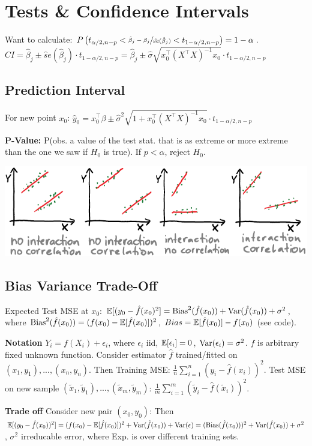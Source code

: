 \section*{Tests \& Confidence Intervals}
Want to calculate: $P\left( t_{\alpha / 2, n-p} < \sfrac{\hat \beta_j - \beta_j} {\hat {se}(\hat \beta_j)} < t_{1-\alpha / 2, n-p} \right) = 1 - \alpha$.
$CI = \hat \beta_j \pm \hat se(\hat \beta_j) \cdot t_{1- \alpha / 2, n-p} = \hat \beta_j \pm \hat \sigma \sqrt{x_0^\top (X^\top X)^{-1} x_0} \cdot t_{1- \alpha / 2, n-p}$
\subsection*{Prediction Interval}
For new point $x_0$:
$\hat y_0 = x_0^\top \beta \pm \hat \sigma^2 \sqrt{1 + x_0^\top (X^\top X)^{-1}x_0} \cdot t_{1-\alpha / 2, n-p}$

\textbf{P-Value:} P(obs. a value of the test stat. that is as extreme or more extreme than the one we saw if $H_0$ is true).
If $p < \alpha$, reject $H_0$.

\includegraphics[width=0.7\linewidth]{img/interaction.PNG}

\subsection*{Bias Variance Trade-Off}
Expected Test MSE at $x_0$: $\mathbb{E}[(y_0 - \hat f(x_0)^2] = \text{Bias}^2 (\hat f(x_0)) + \text{Var}(\hat f(x_0)) + \sigma^2$, where $\text{Bias}^2(\hat f(x_0)) = (f(x_0)-\mathbb{E}[\hat f(x_0)])^2$, $Bias = \mathbb{E}[\hat f(x_0)] - f(x_0)$ (see code).

\textbf{Notation}
$Y_i=f(X_i)+\epsilon_i$, where $\epsilon_i$ iid, $\mathbb{E}[\epsilon_i]=0$, $\textup{Var}(\epsilon_i)=\sigma^2$. $f$ is arbitrary fixed unknown function. Consider estimator $\hat f$ trained/fitted on $(x_1,y_1),...,(x_n,y_n)$. Then Training MSE: $\tfrac{1}{n} \sum_{i=1}^n (y_i-\hat f(x_i))^2$. Test MSE on new sample $(\tilde x_1, \tilde y_1),...,(\tilde x_m, \tilde y_m)$: $\tfrac{1}{m}\sum_{i=1}^m (\tilde y_i-\hat f(\tilde x_i))^2$.

\textbf{Trade off}
Consider new pair $(x_0,y_0)$: Then $\mathbb{E}[(y_0-\hat f(x_0))^2]=(f(x_0)-\mathbb{E}[\hat f(x_0)])^2+\textup{Var}(\hat f(x_0))+\textup{Var}(\epsilon)=(\textup{Bias}(\hat f(x_0)))^2+\textup{Var}(\hat f(x_0))+{\sigma^2}$, $\sigma^2$ irreducable error, where Exp. is over different training sets.

